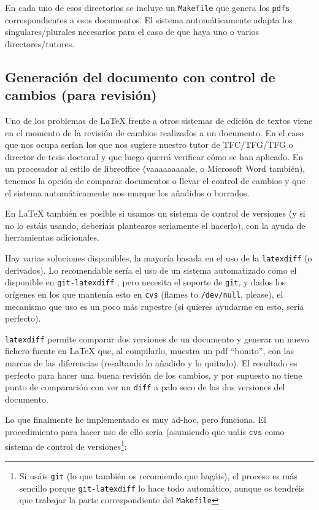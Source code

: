 En cada uno de esos directorios se incluye un \texttt{Makefile} que
genera los \texttt{pdfs} correspondientes a esos documentos. El
sistema automáticamente adapta los singulares/plurales necesarios para
el caso de que haya uno o varios directores/tutores.


\subsection{Generación del documento con control de cambios (para
  revisión)}
\label{sec:control-de-cambios}

Uno de los problemas de \LaTeX{} frente a otros sistemas de edición de
textos viene en el momento de la revisión de cambios realizados a un
documento. En el caso que nos ocupa serían los que nos sugiere nuestro
tutor de TFC/TFG/TFG o director de tesis doctoral y que luego querrá
verificar cómo se han aplicado. En un procesador al estilo de
libreoffice (vaaaaaaaaale, o Microsoft Word también), tenemos la opción
de comparar documentos o llevar el control de cambios y que el sistema
automáticamente nos marque los añadidos o borrados. 

En \LaTeX{} también es posible si usamos un sistema de control de
versiones (y si no lo estáis usando, deberíais plantearos seriamente el
hacerlo), con la ayuda de herramientas adicionales.

Hay varias soluciones disponibles, la mayoría basada en el uso de la
\texttt{latexdiff} \cite{latexdiff} (o derivados). Lo recomendable
sería el uso de un sistema automatizado como el disponible en
\texttt{git-latexdiff} \cite{git-latexdiff}, pero necesita el soporte
de \texttt{git}, y dados los orígenes en los que mantenía esto en
\texttt{cvs} (flames to \texttt{/dev/null}, please), el mecanismo que
uso es un poco más rupestre (si quieres ayudarme en esto, sería
perfecto).

\texttt{latexdiff} permite comparar dos versiones de un documento y
generar un nuevo fichero fuente en \LaTeX{} que, al compilarlo, muestra un
pdf ``bonito'', con las marcas de las diferencias (resaltando lo añadido
y lo quitado). El resultado es perfecto para hacer una buena revisión de
los cambios, y por supuesto no tiene punto de comparación con ver un
\texttt{diff} a palo seco de las dos versiones del documento. 

Lo que finalmente he implementado es muy ad-hoc, pero funciona. El
procedimiento para hacer uso de ello sería (asumiendo que usáis
\texttt{cvs} como sistema de control de versiones\footnote{Si usáis
  \texttt{git} (lo que también os recomiendo que hagáis), el proceso es
  más sencillo porque \texttt{git-latexdiff} lo hace todo automático,
  aunque os tendréis que trabajar la parte correspondiente del
  \texttt{Makefile}}:

